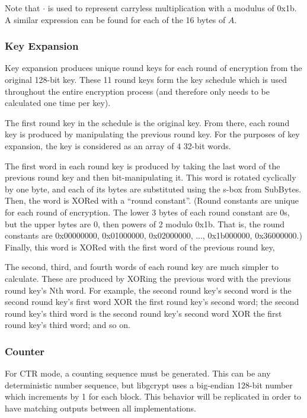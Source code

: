 \documentclass[a4paper,10pt]{article}
\begin{document}
Note that $\cdot$ is used to represent carryless multiplication with a modulus of 0x1b.  A similar expression can be found for each of the 16 bytes of $A$.

\subsubsection{Key Expansion}

Key expansion produces unique round keys for each round of encryption from the original 128-bit key.  These 11  round keys form the key schedule which is used throughout the entire encryption process (and therefore only needs to be calculated one time per key).

The first round key in the schedule is the original key.  From there, each round key is produced by manipulating the previous round key.  For the purposes of key expansion, the key is considered as an array of 4 32-bit words.

The first word in each round key is produced by taking the last word of the previous round key and then bit-manipulating it.  This word is rotated cyclically by one byte, and each of its bytes are substituted using the s-box from SubBytes.  Then, the word is XORed with a ``round constant''.  (Round constants are unique for each round of encryption.  The lower 3 bytes of each round constant are 0s, but the upper bytes are 0, then powers of 2 modulo 0x1b.  That is, the round constants are 0x00000000, 0x01000000, 0x02000000, ..., 0x1b000000, 0x36000000.)  Finally, this word is XORed with the first word of the previous round key,

The second, third, and fourth words of each round key are much simpler to calculate.  These are produced by XORing the previous word with the previous round key's Nth word.  For example, the second round key's second word is the second round key's first word XOR the first round key's second word; the second round key's third word is the second round key's second word XOR the first round key's third word; and so on.

\subsubsection{Counter}

For CTR mode, a counting sequence must be generated.  This can be any deterministic number sequence, but libgcrypt uses a big-endian 128-bit number which increments by 1 for each block.  This behavior will be replicated in order to have matching outputs between all implementations.
\end{document}
